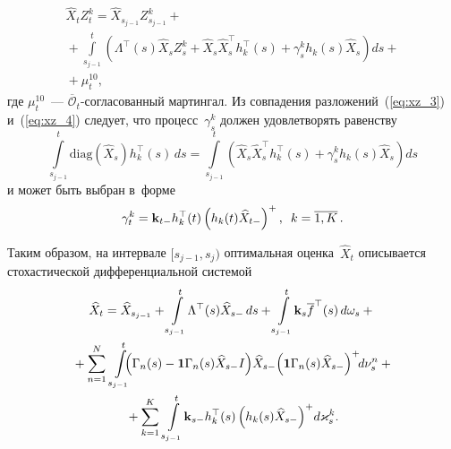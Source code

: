 \begin{multicols}{2}
{\noindent
\begin{multline}
\widehat{X}_tZ_t^k =
\widehat{X}_{s_{j-1}}Z^k_{s_{j-1}}
+{}\\
{}+
\int\limits_{s_{j-1}}^t\!\!
\left(
\Lambda^{\top}(s)\widehat{X}_sZ^k_s +
\widehat{X}_s \widehat{X}_s^{\top} h_k^{\top}(s) +\gamma_s^k h_k(s)\widehat{X}_s
\right)ds  + {}\\
{}+\mu^{10}_t,
\label{eq:xz_4}
\end{multline}
где $\mu_t^{10}$~--- $\overline{\mathcal{O}}_{t}$-со\-гла\-со\-ван\-ный мартингал.  
Из совпадения разложений~(\ref{eq:xz_3}) и~(\ref{eq:xz_4}) следует, что процесс~$\gamma^k_s$ 
должен удовлетворять равенству
$$
\int\limits_{s_{j-1}}^t\!\!\!\!
 \mathrm{diag}\left(\widehat{X}_s\right)h_k^{\top}(s)\,ds =\!\!\!\!
\int\limits_{s_{j-1}}^t \!\!\!\!\left(
\widehat{X}_s \widehat{X}_s^{\top} h_k^{\top}(s) +\gamma_s^k h_k(s)\widehat{X}_s\right)ds
$$
и может быть выбран в~форме
$$
\gamma^k_t\hm =
\mathbf{k}_{t-} h_k^{\top}(t)
\left( h_k(t)\widehat{X}_{t-}\right)^+,\enskip k=\overline{1,K}\,.
$$


Таким образом, на интервале $[s_{j-1},s_{j})$ оптимальная оценка~$\widehat{X}_t$ 
описывается стохастической дифференциальной системой
\begin{multline}
   \widehat{X}_t =
  \widehat{X}_{s_{j-1}}
   + \int\limits_{s_{j-1}}^t\! \Lambda^{\top}(s)\widehat{X}_{s-}\,ds +
   \int\limits_{s_{j-1}}^t \!\mathbf{k}_{s}\overline{f}^{\top}(s)\,d\omega_s +{} \\
   {} +
   \sum\limits_{n=1}^N \,\int\limits_{s_{j-1}}^t\!\!\!\!
   \left(
\Gamma_n(s) - \mathbf{1}\Gamma_n(s)\widehat{X}_{s-} I
\right)\!\widehat{X}_{s-}\!
\left(\mathbf{1}\Gamma_n(s)\widehat{X}_{s-}\right)^+\!\!
    d\nu_s^n + {}\hspace*{-1.07239pt}\\ 
    {}+
     \sum\limits_{k=1}^K\,\int\limits_{s_{j-1}}^t\!
     \mathbf{k}_{s-}h_k^{\top}(s)
\left( h_k(s)\widehat{X}_{s-}\right)^+ \!d \varkappa_s^k.
   \label{eq:f_cut}
 \end{multline}

}
\end{multicols}

